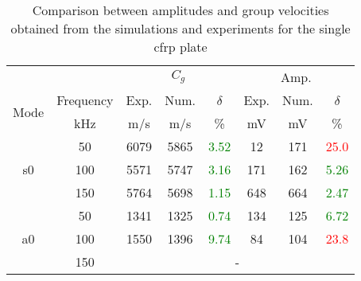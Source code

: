 \documentclass[11pt,a4paper,final]{report}
\theoremstyle{plain}
\begin{document}
\begin{table}[!htb]
	\small
	\tabcolsep=0.2cm
	\centering
	\caption{\label{tab:group_velocity_cfrp} Comparison between amplitudes and group velocities obtained from the simulations and experiments for the single \acs{cfrp} plate}
	\begin{tabular}{cccccccc}
		\toprule
		& & \multicolumn{3}{c}{\(C_g\)} & \multicolumn{3}{c}{Amp.}\\
		\multirow{2}{*}{Mode} & Frequency & Exp. & Num. & \(\delta\)& Exp. & Num. & \(\delta\)\\
		& \unit{\kHz} & \unit[per-mode = symbol]{\m\per\s} & \unit[per-mode = symbol]{\m\per\s} & \% & \unit{\mV} & \unit{\mV} & \% \\
		\midrule
		\multirow{3}{*}{\ac{s0}} & 50 & 6079 & 5865 & \textcolor{green}{3.52}& 12 & 171 & \textcolor{red}{25.0} \\
		&100& 5571 & 5747 & \textcolor{green}{3.16} & 171 & 162 & \textcolor{green}{5.26}\\
		&150& 5764 & 5698 & \textcolor{green}{1.15} & 648 & 664 & \textcolor{green}{2.47}\\
		\midrule
		\multirow{3}{*}{\ac{a0}} &50& 1341 & 1325 & \textcolor{green}{0.74} & 134 & 125 & \textcolor{green}{6.72}\\
		&100& 1550 & 1396 & \textcolor{green}{9.74} & 84 & 104 & \textcolor{red}{23.8}\\
		&150& \multicolumn{6}{c}{-} \\
		\bottomrule
	\end{tabular}
\end{table}
\end{document}
